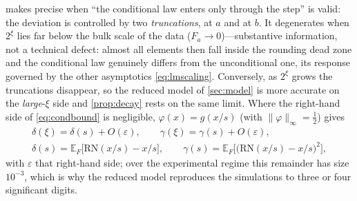 \documentclass[twocolumn,review,hidelinks,oneeqnum,onetabnum,onefignum,onethmnum]{siamart251216}
\begin{document}
\begin{remark}
 makes precise when ``the conditional law enters only through
the step'' is valid: the deviation is controlled by two \emph{truncations}, at
$a$ and at $b$. It degenerates when $2^\xi$ lies far below the bulk scale of the
data ($F_a\to0$)---substantive information, not a technical defect: almost all
elements then fall inside the rounding dead zone and the conditional law
genuinely differs from the unconditional one, its response governed by the other
asymptotics \cref{eq:lmscaling}. Conversely, as $2^\xi$ grows the truncations
disappear, so the reduced model of \cref{sec:model} is more accurate on the
\emph{large}-$\xi$ side and \cref{prop:decay} rests on the same limit. Where the
right-hand side of \cref{eq:condbound} is negligible, $\varphi(x)=g(x/s)$ (with
$\|\varphi\|_\infty=\tfrac12$) gives
\begin{equation}
\begin{gathered}
\delta(\xi)=\delta(s)+O(\varepsilon),\qquad
\gamma(\xi)=\gamma(s)+O(\varepsilon),\\[2pt]
\delta(s)=\mathbb E_F\bigl[\mathrm{RN}(x/s)-x/s\bigr],\qquad
\gamma(s)=\mathbb E_F\bigl[\bigl(\mathrm{RN}(x/s)-x/s\bigr)^2\bigr],
\end{gathered}
\label{eq:deltagamma}
\end{equation}
with $\varepsilon$ that right-hand side; over the experimental regime this
remainder has size $10^{-3}$, which is why the reduced model reproduces the
simulations to three or four significant digits.
\end{remark}
\end{document}
